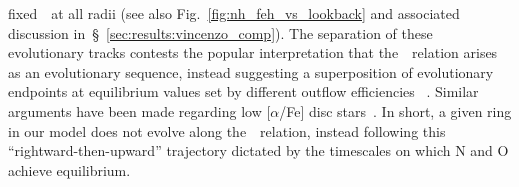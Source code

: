 \documentclass[ms.tex]{subfiles}
\begin{document}
fixed~\oh~at all radii (see also Fig.~\ref{fig:nh_feh_vs_lookback} and
associated discussion in~\S~\ref{sec:results:vincenzo_comp}).
The separation of these evolutionary tracks contests the popular interpretation
that the~\ohno~relation arises as an evolutionary sequence, instead suggesting
a superposition of evolutionary endpoints at equilibrium values set by
different outflow efficiencies~{\color{red} \citep[a similar argument was made
by][]{Chiappini2003}}.
Similar arguments have been made regarding low [$\alpha$/Fe] disc
stars~\citep[e.g.][]{Schoenrich2009, Nidever2014, Buck2020, Sharma2021}.
In short, a given ring in our model does not evolve along the~\ohno~relation,
instead following this ``rightward-then-upward'' trajectory dictated by the
timescales on which N and O achieve equilibrium.
\end{document}
